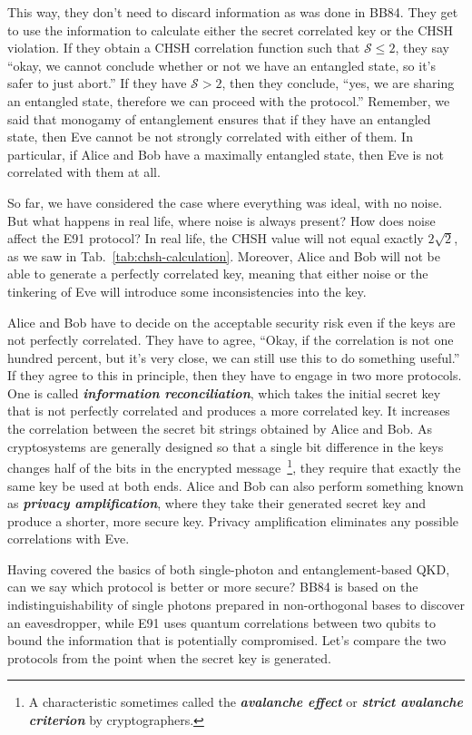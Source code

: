 This way, they don't need to discard information as was done in BB84. They get to use the information to calculate either the secret correlated key or the CHSH violation.
If they obtain a CHSH correlation function such that $\mathcal{S} \leq 2$, they say ``okay, we cannot conclude whether or not we have an entangled state, so it's safer to just abort.''
If they have $\mathcal{S} > 2$, then they conclude, ``yes, we are sharing an entangled state, therefore we can proceed with the protocol.''
Remember, we said that monogamy of entanglement ensures that if they have an entangled state, then Eve cannot be not strongly correlated with either of them.
In particular, if Alice and Bob have a maximally entangled state, then Eve is not correlated with them at all.

So far, we have considered the case where everything was ideal, with no noise.
But what happens in real life, where noise is always present? How does noise affect the E91 protocol?
In real life, the CHSH value will not equal exactly $2\sqrt{2}$, as we saw in Tab.~\ref{tab:chsh-calculation}.
Moreover, Alice and Bob will not be able to generate a perfectly correlated key, meaning that either noise or the tinkering of Eve will introduce some inconsistencies into the key.

Alice and Bob have to decide on the acceptable security risk even if the keys are not perfectly correlated.
They have to agree, ``Okay, if the correlation is not one hundred percent, but it's very close, we can still use this to do something useful.''
If they agree to this in principle, then they have to engage in two more protocols.
One is called  \textbf{\emph{information reconciliation}}, which takes the initial secret key that is not perfectly correlated and produces a more correlated key.
It increases the correlation between the secret bit strings obtained by Alice and Bob.
As cryptosystems are generally designed so that a single bit difference in the keys changes half of the bits in the encrypted message~\footnote{A characteristic sometimes called the \textbf{\emph{avalanche effect}} or \textbf{\emph{strict avalanche criterion}} by cryptographers.}, they require that exactly the same key be used at both ends.
Alice and Bob can also perform something known as \textbf{\emph{privacy amplification}}, where they take their generated secret key and produce a shorter, more secure key.
Privacy amplification eliminates any possible correlations with Eve.

Having covered the basics of both single-photon and entanglement-based QKD, can we say which protocol is better or more secure?
BB84 is based on the indistinguishability of single photons prepared in non-orthogonal bases to discover an eavesdropper, while E91 uses quantum correlations between two qubits to bound the information that is potentially compromised.
Let's compare the two protocols from the point when the secret key is generated.

